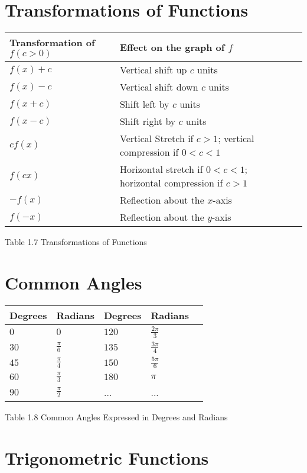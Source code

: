 \section{Transformations of Functions}

\begin{tabular}{*5l} \toprule
	Transformation of \(f(c>0)\) & Effect on the graph of \(f\) \\ \midrule
   \(f(x)+c\) & Vertical shift up \(c\) units \\
    \(f(x)-c\) & Vertical shift down \(c\) units \\
    \(f(x+c)\) & Shift left by \(c\) units \\
    \(f(x-c)\) & Shift right by \(c\) units \\
	\(cf(x)\) & Vertical Stretch if \(c>1\); vertical compression if \(0<c<1\) \\
	\(f(cx)\) & Horizontal stretch if \(0<c<1\); horizontal compression if \(c>1\) \\
	\(-f(x)\) & Reflection about the \(x\)-axis \\
	\(f(-x)\) & Reflection about the \(y\)-axis \\ \bottomrule
\end{tabular}

	Table 1.7 Transformations of Functions

	\section{Common Angles}

	\begin{tabular}{*5l} \toprule
		Degrees & Radians & Degrees & Radians \\ \midrule
	   \(0\) & \(0\) & \(120\) & \(\frac{2\pi}{3}\) \\
	\(30\) & \(\frac{\pi}{6}\) & \(135\) & \(\frac{3\pi}{4}\) \\
	\(45\) & \(\frac{\pi}{4}\) & \(150\) & \(\frac{5\pi}{6}\) \\
	\(60\) & \(\frac{\pi}{3}\) & \(180\) & \(\pi\) \\
	\(90\) & \(\frac{\pi}{2}\) & ... & ... \\ \bottomrule
	\end{tabular}

	Table 1.8 Common Angles Expressed in Degrees and Radians

\section{Trigonometric Functions}

